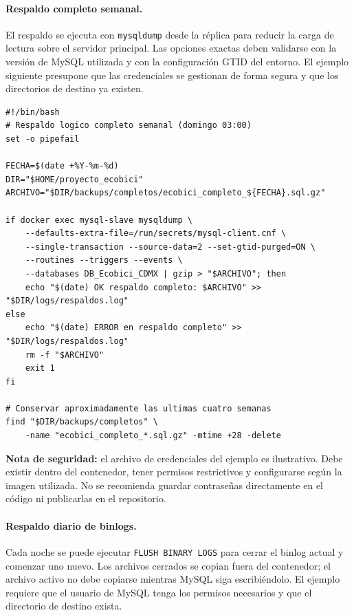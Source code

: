 \documentclass[10pt,a4paper]{article}
\begin{document}
\paragraph{Respaldo completo semanal.}
El respaldo se ejecuta con \texttt{mysqldump} desde la réplica para reducir la carga de lectura sobre el servidor principal. Las opciones exactas deben validarse con la versión de MySQL utilizada y con la configuración GTID del entorno. El ejemplo siguiente presupone que las credenciales se gestionan de forma segura y que los directorios de destino ya existen.

\begin{lstlisting}
#!/bin/bash
# Respaldo logico completo semanal (domingo 03:00)
set -o pipefail

FECHA=$(date +%Y-%m-%d)
DIR="$HOME/proyecto_ecobici"
ARCHIVO="$DIR/backups/completos/ecobici_completo_${FECHA}.sql.gz"

if docker exec mysql-slave mysqldump \
    --defaults-extra-file=/run/secrets/mysql-client.cnf \
    --single-transaction --source-data=2 --set-gtid-purged=ON \
    --routines --triggers --events \
    --databases DB_Ecobici_CDMX | gzip > "$ARCHIVO"; then
    echo "$(date) OK respaldo completo: $ARCHIVO" >> "$DIR/logs/respaldos.log"
else
    echo "$(date) ERROR en respaldo completo" >> "$DIR/logs/respaldos.log"
    rm -f "$ARCHIVO"
    exit 1
fi

# Conservar aproximadamente las ultimas cuatro semanas
find "$DIR/backups/completos" \
    -name "ecobici_completo_*.sql.gz" -mtime +28 -delete
\end{lstlisting}

\textbf{Nota de seguridad:} el archivo de credenciales del ejemplo es ilustrativo. Debe existir dentro del contenedor, tener permisos restrictivos y configurarse según la imagen utilizada. No se recomienda guardar contraseñas directamente en el código ni publicarlas en el repositorio.

\newpage

\paragraph{Respaldo diario de binlogs.}
Cada noche se puede ejecutar \texttt{FLUSH BINARY LOGS} para cerrar el binlog actual y comenzar uno nuevo. Los archivos cerrados se copian fuera del contenedor; el archivo activo no debe copiarse mientras MySQL siga escribiéndolo. El ejemplo requiere que el usuario de MySQL tenga los permisos necesarios y que el directorio de destino exista.
\end{document}
